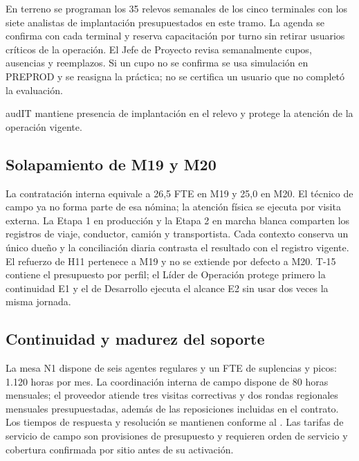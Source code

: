 En terreno se programan los 35 relevos semanales de los cinco terminales con los siete analistas
de implantación presupuestados en este tramo. La agenda se confirma con cada terminal y
reserva capacitación por turno sin retirar usuarios críticos de la operación. El Jefe de Proyecto
revisa semanalmente cupos, ausencias y reemplazos. Si un cupo no se confirma se usa simulación
en PREPROD y se reasigna la práctica; no se certifica un usuario que no completó la evaluación.

\begin{compromiso}[metrica={35 turnos de relevo semanales en los cinco terminales durante marcha blanca y estabilización E1},
verifica={registro semanal de turno, ejecutor y suplencia},fuente={\caso{numeral 13.3}{27}}]
audIT mantiene presencia de implantación en el relevo y protege la atención de la operación vigente.
\end{compromiso}

\subsection{Solapamiento de M19 y M20}\label{sec:7-solapamiento-19-20}

La contratación interna equivale a 26,5 FTE en M19 y 25,0 en M20. El técnico de campo ya no
forma parte de esa nómina; la atención física se ejecuta por visita externa. La Etapa 1 en
producción y la Etapa 2 en marcha blanca comparten los registros de viaje, conductor, camión y
transportista. Cada contexto conserva un único dueño y la conciliación diaria contrasta el
resultado con el registro vigente. El refuerzo de H11 pertenece a M19 y no se extiende por
defecto a M20. T-15 contiene el presupuesto por perfil; el Líder de Operación protege primero
la continuidad E1 y el de Desarrollo ejecuta el alcance E2 sin usar dos veces la misma jornada.

\subsection{Continuidad y madurez del soporte}\label{sec:7-soporte32}

La mesa N1 dispone de seis agentes regulares y un FTE de suplencias y picos: 1.120 horas por mes.
La coordinación interna de campo dispone de 80 horas mensuales; el proveedor atiende tres visitas
correctivas y dos rondas regionales mensuales presupuestadas, además de las reposiciones incluidas
en el contrato. Los tiempos de respuesta y resolución se mantienen conforme al .
Las tarifas de servicio de campo son provisiones de presupuesto y requieren orden de servicio
y cobertura confirmada por sitio antes de su activación.

